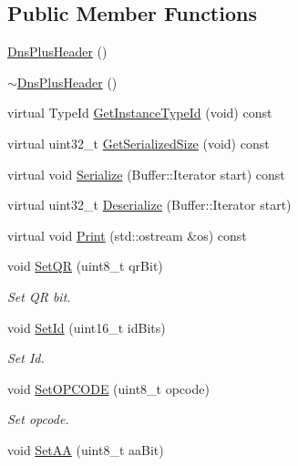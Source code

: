 \subsection*{Public Member Functions}
\begin{DoxyCompactItemize}
\item 
\hyperlink{classns3_1_1DnsPlusHeader_aa39739cfaece6711a01861f45f0e6067}{Dns\-Plus\-Header} ()
\item 
\hyperlink{classns3_1_1DnsPlusHeader_a16cd6385e338fbb7cdcd0c6d33ccc7bb}{$\sim$\-Dns\-Plus\-Header} ()
\item 
virtual Type\-Id \hyperlink{classns3_1_1DnsPlusHeader_a4d290db0c63ed92adc4cdbd09fe84c24}{Get\-Instance\-Type\-Id} (void) const 
\item 
virtual uint32\-\_\-t \hyperlink{classns3_1_1DnsPlusHeader_ac951e2cb1473ec87540b829c2d572b39}{Get\-Serialized\-Size} (void) const 
\item 
virtual void \hyperlink{classns3_1_1DnsPlusHeader_af396f9396640c877af51efaf2f199072}{Serialize} (Buffer\-::\-Iterator start) const 
\item 
virtual uint32\-\_\-t \hyperlink{classns3_1_1DnsPlusHeader_a4fd5e5a6b42851c06ddf3aec0e357768}{Deserialize} (Buffer\-::\-Iterator start)
\item 
virtual void \hyperlink{classns3_1_1DnsPlusHeader_a1db3739a5909bf66de04839fd455c244}{Print} (std\-::ostream \&os) const 
\item 
void \hyperlink{classns3_1_1DnsPlusHeader_a163bb071a4227854dcdd139c7f98cd27}{Set\-Q\-R} (uint8\-\_\-t qr\-Bit)
\begin{DoxyCompactList}\small\item\em Set Q\-R bit. \end{DoxyCompactList}\item 
void \hyperlink{classns3_1_1DnsPlusHeader_aaeb6a6c63353ba23e4b992f4bac58b05}{Set\-Id} (uint16\-\_\-t id\-Bits)
\begin{DoxyCompactList}\small\item\em Set Id. \end{DoxyCompactList}\item 
void \hyperlink{classns3_1_1DnsPlusHeader_a3b6ee82ad16a50f44ee634477e73b560}{Set\-O\-P\-C\-O\-D\-E} (uint8\-\_\-t opcode)
\begin{DoxyCompactList}\small\item\em Set opcode. \end{DoxyCompactList}\item 
void \hyperlink{classns3_1_1DnsPlusHeader_a101aaca4f9508380a7bb27b170de4c9f}{Set\-A\-A} (uint8\-\_\-t aa\-Bit)

\end{DoxyCompactItemize}
